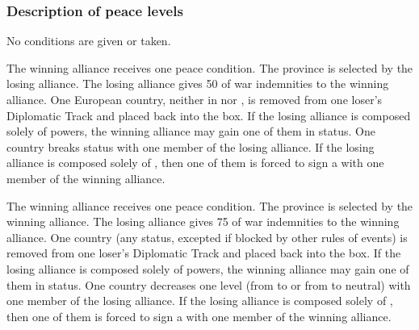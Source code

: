 \subsubsection{Description of peace levels}
 No conditions are given or taken.

 The winning alliance receives one peace condition.
 The province is selected by the losing
alliance.
\bparag[Indemnities] The losing alliance gives 50 \ducats of war indemnities
to the winning alliance.
 One European country, neither in
\VASSAL nor \ANNEXION, is removed from one loser's Diplomatic Track and placed
back into the \Neutral box. If the losing alliance is composed solely of \MIN
powers, the winning alliance may gain one of them in \MR status.
 One \ROTW country breaks \dipFR status with
one member of the losing alliance. If the losing alliance is composed solely
of \MIN, then one of them is forced to sign a \dipFR with one member of the
winning alliance.

 The winning alliance receives one peace
condition.
 The province is selected by the winning
alliance. 
\bparag[Indemnities] The losing alliance gives 75 \ducats of war indemnities
to the winning alliance.
 One country (any status, excepted if
blocked by other rules of events) is removed from one loser's Diplomatic Track
and placed back into the \Neutral box. If the losing alliance is composed
solely of \MIN powers, the winning alliance may gain one of them in \MR
status.
 One \ROTW country decreases one level
(from \dipAT to \dipFR or from \dipFR to neutral) with one member of the losing
alliance. If the losing alliance is composed solely of \MIN, then one of them
is forced to sign a \dipFR with one member of the winning alliance.

